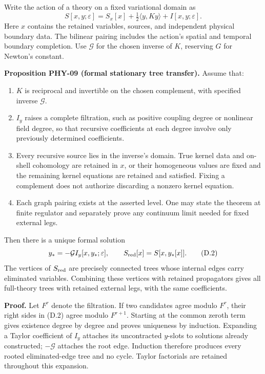 Write the action of a theory on a fixed variational domain as \[
S[x,y;\varepsilon]
=S_x[x]+\tfrac12\langle y,Ky\rangle+I[x,y;\varepsilon].
\tag{D.1}
\] Here \(x\) contains the retained variables, sources, and independent physical boundary data. The bilinear pairing includes the action's spatial and temporal boundary completion. Use \(\mathcal G\) for the chosen inverse of \(K\), reserving \(G\) for Newton's constant.

\textbf{Proposition PHY-09 (formal stationary tree transfer).} Assume that:

\begin{enumerate}
\def\labelenumi{\arabic{enumi}.}
\tightlist
\item
  \(K\) is reciprocal and invertible on the chosen complement, with specified inverse \(\mathcal G\).
\item
  \(I_y\) raises a complete filtration, such as positive coupling degree or nonlinear field degree, so that recursive coefficients at each degree involve only previously determined coefficients.
\item
  Every recursive source lies in the inverse's domain. True kernel data and on-shell cohomology are retained in \(x\), or their homogeneous values are fixed and the remaining kernel equations are retained and satisfied. Fixing a complement does not authorize discarding a nonzero kernel equation.
\item
  Each graph pairing exists at the asserted level. One may state the theorem at finite regulator and separately prove any continuum limit needed for fixed external legs.
\end{enumerate}

Then there is a unique formal solution \[
y_*=-\mathcal G I_y[x,y_*;\varepsilon],
\qquad S_{\rm red}[x]=S[x,y_*[x]].
\tag{D.2}
\] The vertices of \(S_{\rm red}\) are precisely connected trees whose internal edges carry eliminated variables. Combining these vertices with retained propagators gives all full-theory trees with retained external legs, with the same coefficients.

\textbf{Proof.} Let \(F^r\) denote the filtration. If two candidates agree modulo \(F^r\), their right sides in (D.2) agree modulo \(F^{r+1}\). Starting at the common zeroth term gives existence degree by degree and proves uniqueness by induction. Expanding a Taylor coefficient of \(I_y\) attaches its uncontracted \(y\)-slots to solutions already constructed; \(-\mathcal G\) attaches the root edge. Induction therefore produces every rooted eliminated-edge tree and no cycle. Taylor factorials are retained throughout this expansion.

